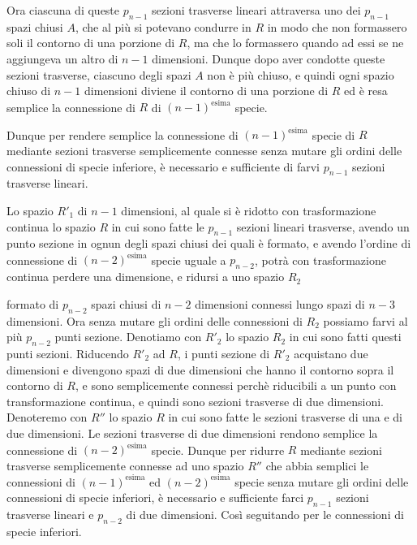\documentclass{article}
\begin{document}
Ora ciascuna di queste $p_{n-1}$ sezioni trasverse lineari attraversa uno dei $p_{n-1}$ spazi chiusi $A$, che al più si potevano condurre in $R$ in modo che non formassero soli il contorno di una porzione di $R$, ma che lo formassero quando ad essi se ne aggiungeva un altro di $n-1$ dimensioni. Dunque dopo aver condotte queste sezioni trasverse, ciascuno degli spazi $A$ non è più chiuso, e quindi ogni spazio chiuso di $n-1$ dimensioni diviene il contorno di una porzione di $R$ ed è resa semplice la connessione di $R$ di $(n-1)^{\text{esima}}$ specie.

Dunque per rendere semplice la connessione di $(n-1)^{\text{esima}}$ specie di $R$ mediante sezioni trasverse semplicemente connesse senza mutare gli ordini delle connessioni di specie inferiore, è necessario e sufficiente di farvi $p_{n-1}$ sezioni trasverse lineari.

Lo spazio $R'_{1}$ di $n-1$ dimensioni, al quale si è ridotto con trasformazione continua lo spazio $R$ in cui sono fatte le $p_{n-1}$ sezioni lineari trasverse, avendo un punto sezione in ognun degli spazi chiusi dei quali è formato, e avendo l'ordine di connessione di $(n-2)^{\text{esima}}$ specie uguale a $p_{n-2}$, potrà con trasformazione continua perdere una dimensione, e ridursi a uno spazio $R_{2}$

formato di $p_{n-2}$ spazi chiusi di $n-2$ dimensioni connessi lungo spazi di $n-3$ dimensioni. Ora senza mutare gli ordini delle connessioni di $R_{2}$ possiamo farvi al più $p_{n-2}$ punti sezione. Denotiamo con $R'_{2}$ lo spazio $R_{2}$ in cui sono fatti questi punti sezioni. Riducendo $R'_{2}$ ad $R$, i punti sezione di $R'_{2}$ acquistano due dimensioni e divengono spazi di due dimensioni che hanno il contorno sopra il contorno di $R$, e sono semplicemente connessi perchè riducibili a un punto con transformazione continua, e quindi sono sezioni trasverse di due dimensioni. Denoteremo con $R''$ lo spazio $R$ in cui sono fatte le sezioni trasverse di una e di due dimensioni. Le sezioni trasverse di due dimensioni rendono semplice la connessione di $(n-2)^{\text{esima}}$ specie. Dunque per ridurre $R$ mediante sezioni trasverse semplicemente connesse ad uno spazio $R''$ che abbia semplici le connessioni di $(n-1)^{\text{esima}}$ ed $(n-2)^{\text{esima}}$ specie senza mutare gli ordini delle connessioni di specie inferiori, è necessario e sufficiente farci $p_{n-1}$ sezioni trasverse lineari e $p_{n-2}$ di due dimensioni. Così seguitando per le connessioni di specie inferiori.
\end{document}
